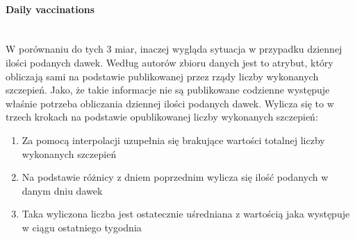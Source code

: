 \documentclass[12pt, oneside]{article}
\begin{document}
\newpage

\paragraph{Daily vaccinations}
\mbox{}\\

W porównaniu do tych 3 miar, inaczej wygląda sytuacja w przypadku dziennej ilości podanych dawek. Według autorów zbioru danych jest to atrybut, który obliczają sami na podstawie publikowanej przez rządy liczby wykonanych szczepień. Jako, że takie informacje nie są publikowane codzienne występuje  właśnie potrzeba obliczania dziennej ilości podanych dawek. Wylicza się to w trzech krokach na podstawie opublikowanej liczby wykonanych szczepień:
\begin{enumerate}
\item Za pomocą interpolacji uzupełnia się brakujące wartości totalnej liczby wykonanych szczepień
\item Na podstawie różnicy z dniem poprzednim wylicza się ilość podanych w danym dniu dawek
\item Taka wyliczona liczba jest ostatecznie uśredniana z wartością jaka występuje w ciągu ostatniego tygodnia 
\end{enumerate}






\end{document}
